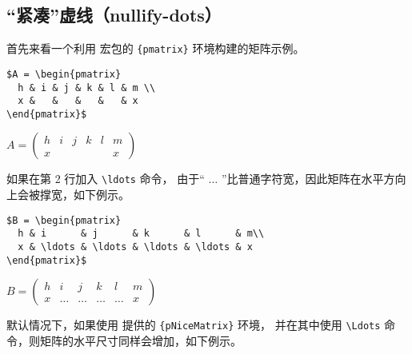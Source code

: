 \documentclass[dvipsnames]{article}%
\begin{document}
\subsection{“紧凑”虚线（nullify-dots）}

首先来看一个利用  宏包的 \verb|{pmatrix}| 环境构建的矩阵示例。\par\nobreak 

\bigskip
\begin{BVerbatim}[baseline=c,boxwidth=9cm]
$A = \begin{pmatrix}
  h & i & j & k & l & m \\
  x &   &   &   &   & x 
\end{pmatrix}$
\end{BVerbatim}
$A = \begin{pmatrix}
h & i & j & k & l & m \\
x   &     &     &    &     & x 
\end{pmatrix}$


\bigskip
如果在第 2 行加入 \verb|\ldots| 命令，
由于“ $\ldots$ ”比普通字符宽，因此矩阵在水平方向上会被撑宽，如下例示。\par\nobreak

\bigskip
\begin{BVerbatim}[baseline=c,boxwidth=9cm]
$B = \begin{pmatrix}
  h & i      & j      & k      & l      & m\\
  x & \ldots & \ldots & \ldots & \ldots & x 
\end{pmatrix}$
\end{BVerbatim}
$B = \begin{pmatrix}
h & i & j & k & l & m \\
x   & \ldots   & \ldots  & \ldots & \ldots & x 
\end{pmatrix}$

\bigskip
默认情况下，如果使用  提供的 \verb|{pNiceMatrix}| 环境，
并在其中使用 \verb|\Ldots| 命令，则矩阵的水平尺寸同样会增加，如下例示。\par\nobreak
\end{document}
